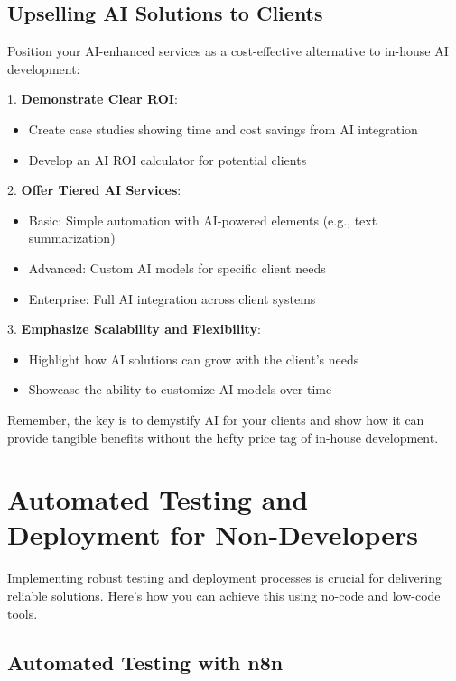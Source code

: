 \subsection{Upselling AI Solutions to Clients}

Position your AI-enhanced services as a cost-effective alternative to in-house AI development:

1. \textbf{Demonstrate Clear ROI}:
\begin{itemize}
    \item Create case studies showing time and cost savings from AI integration
    \item Develop an AI ROI calculator for potential clients
\end{itemize}

2. \textbf{Offer Tiered AI Services}:
\begin{itemize}
    \item Basic: Simple automation with AI-powered elements (e.g., text summarization)
    \item Advanced: Custom AI models for specific client needs
    \item Enterprise: Full AI integration across client systems
\end{itemize}

3. \textbf{Emphasize Scalability and Flexibility}:
\begin{itemize}
    \item Highlight how AI solutions can grow with the client's needs
    \item Showcase the ability to customize AI models over time
\end{itemize}

Remember, the key is to demystify AI for your clients and show how it can provide tangible benefits without the hefty price tag of in-house development.

\section{Automated Testing and Deployment for Non-Developers}

Implementing robust testing and deployment processes is crucial for delivering reliable solutions. Here's how you can achieve this using no-code and low-code tools.

\clearpage

\subsection{Automated Testing with n8n}

